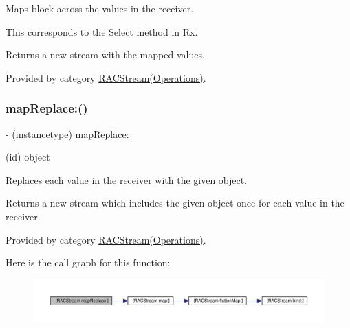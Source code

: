 Maps {\ttfamily block} across the values in the receiver.

This corresponds to the {\ttfamily Select} method in Rx.

Returns a new stream with the mapped values. 

Provided by category \mbox{\hyperlink{category_r_a_c_stream_07_operations_08_ae8e14cc70fb3979e6128d28b003bba3f}{R\+A\+C\+Stream(\+Operations)}}.

\mbox{\label{interface_r_a_c_stream_a9e55da434f4cf84e14f9133ac48383b8}} 
\subsubsection{\texorpdfstring{map\+Replace\+:()}{mapReplace:()}\hspace{0.1cm}{\footnotesize\ttfamily [1/3]}}
{\footnotesize\ttfamily -\/ (instancetype) map\+Replace\+: \begin{DoxyParamCaption}\item[{(id)}]{object }\end{DoxyParamCaption}}

Replaces each value in the receiver with the given object.

Returns a new stream which includes the given object once for each value in the receiver. 

Provided by category \mbox{\hyperlink{category_r_a_c_stream_07_operations_08_a9e55da434f4cf84e14f9133ac48383b8}{R\+A\+C\+Stream(\+Operations)}}.

Here is the call graph for this function\+:\nopagebreak
\begin{figure}[H]
\begin{center}
\leavevmode
\includegraphics[width=350pt]{interface_r_a_c_stream_a9e55da434f4cf84e14f9133ac48383b8_cgraph}
\end{center}
\end{figure}
\mbox{\label{interface_r_a_c_stream_a9e55da434f4cf84e14f9133ac48383b8}} 
